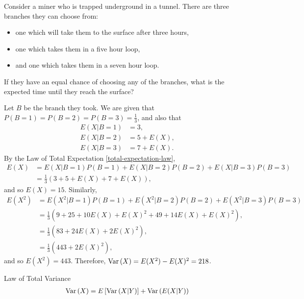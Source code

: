 \begin{exmp}
    Consider a miner who is trapped underground in a tunnel. There are three branches they can choose from:
    \begin{itemize}
        \item one which will take them to the surface after three hours,
        \item one which takes them in a five hour loop,
        \item and one which takes them in a seven hour loop.
    \end{itemize}
    If they have an equal chance of choosing any of the branches, what is the expected time until they reach the surface?

    Let $B$ be the branch they took. We are given that $P(B = 1) = P(B = 2) = P(B = 3) = \frac{1}{3}$, and also that
    \begin{align*}
        E(X|B=1) &= 3, \\
        E(X|B=2) &= 5 + E(X), \\
        E(X|B=3) &= 7 + E(X).
    \end{align*}
    By the Law of Total Expectation \ref{total-expectation-law},
    \begin{align*}
        E(X) &= E(X|B=1)P(B=1) + E(X|B=2)P(B=2) + E(X|B=3)P(B=3) \\
        &= \frac{1}{3}\left(3 + 5 + E(X) + 7 + E(X)\right),
    \end{align*}
    and so $E(X) = 15$. Similarly,
    \begin{align*}
        E(X^2) &= E(X^2|B=1)P(B=1) + E(X^2|B=2)P(B=2) + E(X^2|B=3)P(B=3) \\
        &= \frac{1}{3}\left(9 + 25 + 10E(X) + E(X)^2 + 49 + 14E(X) + E(X)^2\right), \\
        &= \frac{1}{3}\left(83 + 24E(X) + 2E(X)^2\right), \\
        &= \frac{1}{3}\left(443 + 2E(X)^2\right),
    \end{align*}
    and so $E(X^2) = 443$. Therefore, $\operatorname{Var}\left(X\right) = E(X^2) - E(X)^2 = 218$.
\end{exmp}

\begin{thm}{Law of Total Variance}\label{total-variance-law}
    \begin{align*}
        \operatorname{Var}\left(X\right) = E\left[\operatorname{Var}\left(X|Y\right)\right] + \operatorname{Var}\left(E(X|Y)\right)
    \end{align*}
\end{thm}

